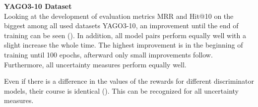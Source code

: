 \textbf{YAGO3-10 Dataset}
\label{subsubsec:metrics_yago3_10}\\
%
Looking at the development of evaluation metrics MRR and Hit@10 on the biggest among all used datasets \textsc{YAGO3-10}, an improvement until the end of training can be seen ().
In addition, all model pairs perform equally well with a slight increase the whole time.
The highest improvement is in the beginning of training until 100 epochs, afterward only  small improvements follow.
Furthermore, all uncertainty measures perform equally well.

Even if there is a difference in the values of the rewards for different discriminator models, their course is identical ().
This can be recognized for all uncertainty measures.


